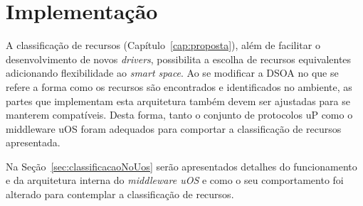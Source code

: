 \chapter{Implementação}

A classificação de recursos (Capítulo~\ref{cap:proposta}), além de facilitar o desenvolvimento de novos \emph{drivers}, possibilita a escolha de recursos equivalentes adicionando flexibilidade ao \emph{smart space}. Ao se modificar a DSOA no que se refere a forma como os recursos são encontrados e identificados no ambiente, as partes que implementam esta arquitetura também devem ser ajustadas para se manterem compatíveis. Desta forma, tanto o conjunto de protocolos uP como o middleware uOS foram adequados para comportar a classificação de recursos apresentada.

Na Seção~\ref{sec:classificacaoNoUos} serão apresentados detalhes do funcionamento e da arquitetura interna do \emph{middleware uOS} e como o seu comportamento foi alterado para contemplar a classificação de recursos.



